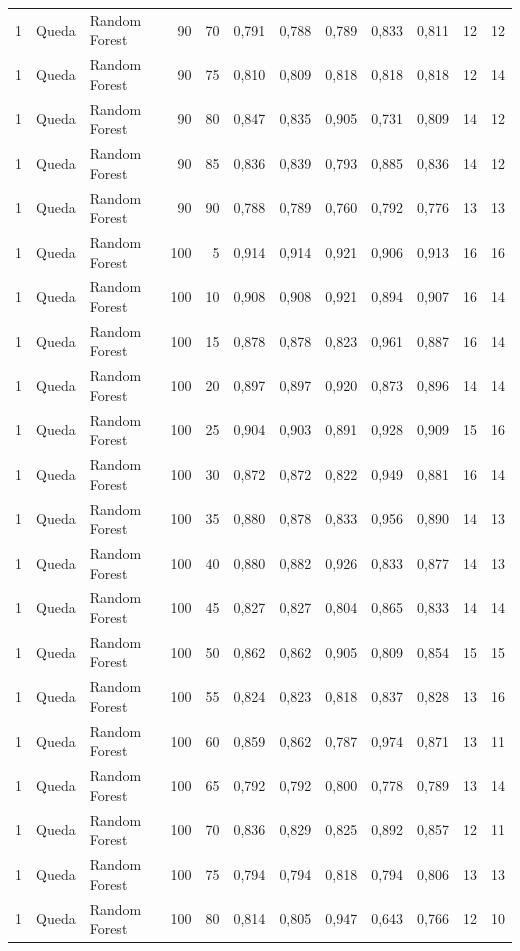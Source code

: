 \begin{longtable}{@{}rllrrrrrrrrr@{}}
1 & Queda & Random Forest & 90 & 70 & 0,791 & 0,788 & 0,789 & 0,833 & 0,811 & 12 & 12 \\
1 & Queda & Random Forest & 90 & 75 & 0,810 & 0,809 & 0,818 & 0,818 & 0,818 & 12 & 14 \\
1 & Queda & Random Forest & 90 & 80 & 0,847 & 0,835 & 0,905 & 0,731 & 0,809 & 14 & 12 \\
1 & Queda & Random Forest & 90 & 85 & 0,836 & 0,839 & 0,793 & 0,885 & 0,836 & 14 & 12 \\
1 & Queda & Random Forest & 90 & 90 & 0,788 & 0,789 & 0,760 & 0,792 & 0,776 & 13 & 13 \\
1 & Queda & Random Forest & 100 & 5 & 0,914 & 0,914 & 0,921 & 0,906 & 0,913 & 16 & 16 \\
1 & Queda & Random Forest & 100 & 10 & 0,908 & 0,908 & 0,921 & 0,894 & 0,907 & 16 & 14 \\
1 & Queda & Random Forest & 100 & 15 & 0,878 & 0,878 & 0,823 & 0,961 & 0,887 & 16 & 14 \\
1 & Queda & Random Forest & 100 & 20 & 0,897 & 0,897 & 0,920 & 0,873 & 0,896 & 14 & 14 \\
1 & Queda & Random Forest & 100 & 25 & 0,904 & 0,903 & 0,891 & 0,928 & 0,909 & 15 & 16 \\
1 & Queda & Random Forest & 100 & 30 & 0,872 & 0,872 & 0,822 & 0,949 & 0,881 & 16 & 14 \\
1 & Queda & Random Forest & 100 & 35 & 0,880 & 0,878 & 0,833 & 0,956 & 0,890 & 14 & 13 \\
1 & Queda & Random Forest & 100 & 40 & 0,880 & 0,882 & 0,926 & 0,833 & 0,877 & 14 & 13 \\
1 & Queda & Random Forest & 100 & 45 & 0,827 & 0,827 & 0,804 & 0,865 & 0,833 & 14 & 14 \\
1 & Queda & Random Forest & 100 & 50 & 0,862 & 0,862 & 0,905 & 0,809 & 0,854 & 15 & 15 \\
1 & Queda & Random Forest & 100 & 55 & 0,824 & 0,823 & 0,818 & 0,837 & 0,828 & 13 & 16 \\
1 & Queda & Random Forest & 100 & 60 & 0,859 & 0,862 & 0,787 & 0,974 & 0,871 & 13 & 11 \\
1 & Queda & Random Forest & 100 & 65 & 0,792 & 0,792 & 0,800 & 0,778 & 0,789 & 13 & 14 \\
1 & Queda & Random Forest & 100 & 70 & 0,836 & 0,829 & 0,825 & 0,892 & 0,857 & 12 & 11 \\
1 & Queda & Random Forest & 100 & 75 & 0,794 & 0,794 & 0,818 & 0,794 & 0,806 & 13 & 13 \\
1 & Queda & Random Forest & 100 & 80 & 0,814 & 0,805 & 0,947 & 0,643 & 0,766 & 12 & 10 \\

\end{longtable}
